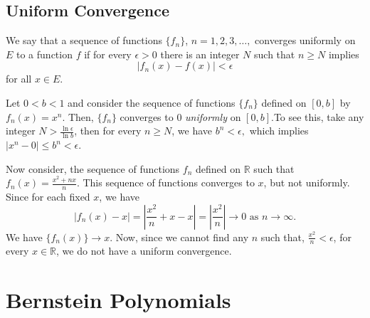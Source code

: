 \documentclass[12pt]{article}
\begin{document}


\subsection{Uniform Convergence}
\begin{definition}\cite{rudin1976principles}
    We say that a sequence of functions $\{f_n\}$, $n = 1, 2, 3, \dots, $ converges uniformly on $E$ to a function $f$ if for every $\epsilon > 0$ there is an integer $N$ such that $n \geq N$ implies
    \begin{equation}
        |f_n(x) - f(x)| < \epsilon
    \end{equation}
    for all $x \in E$.
\end{definition}

\begin{example}
    Let $0 < b < 1$ and consider the sequence of functions $\{f_n\}$ defined on $[0, b]$ by $f_n(x) = x^n$. Then, $\{f_n\}$ converges to $0$ \textit{uniformly} on $[0, b]$.To see this, take any integer $N > \frac{\ln{\epsilon}}{\ln{b}}$, then for every $n \geq N$, we have $b^n < \epsilon,$ which implies $|x^n-0| \leq b^n < \epsilon$.

\end{example}
 

\begin{example}
    Now consider, the sequence of functions $f_n$ defined on $\mathbb{R}$ such that $f_n(x) = \frac{x^2+nx}{n}$. This sequence of functions converges to $x$, but not uniformly.
    Since for each fixed $x$, we have
    \begin{equation*}
        |f_n(x)-x|=\left|\frac{x^2}{n}+x-x\right| = \left|\frac{x^2}{n}\right|\rightarrow0 \text{ as } n \rightarrow \infty.
    \end{equation*}
    We have $\{f_n(x)\}\rightarrow x$. Now, since we cannot find any $n$ such that, $\frac{x^2}{n} < \epsilon$, for every $x \in \mathbb{R}$, we do not have a uniform convergence.
\end{example}
\newpage


\section{Bernstein Polynomials}

\end{document}

